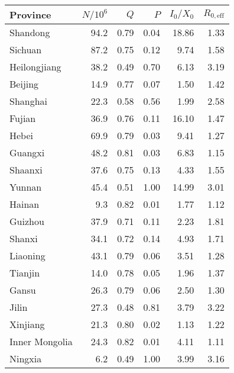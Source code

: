 \begin{tabular}{lrrrrr}
\hline
 Province       &   $N/10^6$ &   $Q$ &   $P$ &   $I_0/X_0$ &   $R_{0,\mathrm{eff}}$ \\
\hline
 Shandong       &       94.2 &  0.79 &  0.04 &       18.86 &                   1.33 \\
 Sichuan        &       87.2 &  0.75 &  0.12 &        9.74 &                   1.58 \\
 Heilongjiang   &       38.2 &  0.49 &  0.70 &        6.13 &                   3.19 \\
 Beijing        &       14.9 &  0.77 &  0.07 &        1.50 &                   1.42 \\
 Shanghai       &       22.3 &  0.58 &  0.56 &        1.99 &                   2.58 \\
 Fujian         &       36.9 &  0.76 &  0.11 &       16.10 &                   1.47 \\
 Hebei          &       69.9 &  0.79 &  0.03 &        9.41 &                   1.27 \\
 Guangxi        &       48.2 &  0.81 &  0.03 &        6.83 &                   1.15 \\
 Shaanxi        &       37.6 &  0.75 &  0.13 &        4.33 &                   1.55 \\
 Yunnan         &       45.4 &  0.51 &  1.00 &       14.99 &                   3.01 \\
 Hainan         &        9.3 &  0.82 &  0.01 &        1.77 &                   1.12 \\
 Guizhou        &       37.9 &  0.71 &  0.11 &        2.23 &                   1.81 \\
 Shanxi         &       34.1 &  0.72 &  0.14 &        4.93 &                   1.71 \\
 Liaoning       &       43.1 &  0.79 &  0.06 &        3.51 &                   1.28 \\
 Tianjin        &       14.0 &  0.78 &  0.05 &        1.96 &                   1.37 \\
 Gansu          &       26.3 &  0.79 &  0.06 &        2.50 &                   1.30 \\
 Jilin          &       27.3 &  0.48 &  0.81 &        3.79 &                   3.22 \\
 Xinjiang       &       21.3 &  0.80 &  0.02 &        1.13 &                   1.22 \\
 Inner Mongolia &       24.3 &  0.82 &  0.01 &        4.11 &                   1.11 \\
 Ningxia        &        6.2 &  0.49 &  1.00 &        3.99 &                   3.16 \\
\hline
\end{tabular}